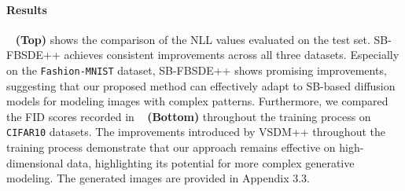 \paragraph{Results}
~ \textbf{(Top)} shows the comparison of the NLL values evaluated on the test set. 
SB-FBSDE++ achieves consistent improvements across all three datasets.
Especially on the \texttt{Fashion-MNIST} dataset, SB-FBSDE++ shows promising improvements, suggesting that our proposed method can effectively adapt to SB-based diffusion models for modeling images with complex patterns.
Furthermore, we compared the FID scores recorded in ~ \textbf{(Bottom)} throughout the training process on \texttt{CIFAR10} datasets. 
The improvements introduced by VSDM++ throughout the training process demonstrate that our approach remains effective on high-dimensional data, highlighting its potential for more complex generative modeling.
The generated images are provided in Appendix 3.3.

\begin{table}[!t]
    \centering
    \caption{\small \textbf{(Top)} Image data modeling evaluation using negative log-likelihood (NLL; bits/dim) on the test set. \textbf{(Bottom)} Comparison of convergence speed of FID scores for VSDM and VSDM++.}
        \label{tab: image}
    \begin{minipage}{0.48\textwidth} 
        \centering
    \end{minipage}
    \begin{minipage}{0.48\textwidth} 
    \vspace{3mm}
        \centering
    \end{minipage}
\end{table}

